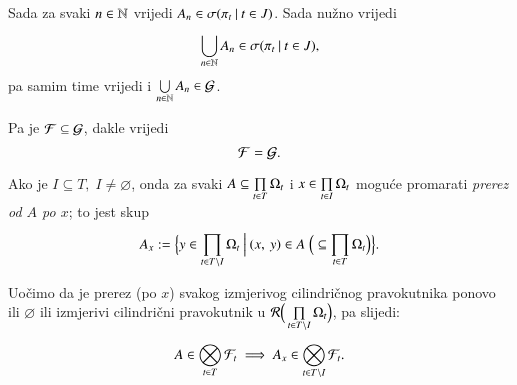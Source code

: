 \begin{rj}
\begin{enumerate}[label=(\roman*)]
        Sada za svaki $n \in \mathbb{N}$ vrijedi $A_n \in \sigma({\pi_t} \: | \: {t \in J})$.
        Sada nu\v zno vrijedi
        \begin{equation*}
            \bigcup\limits_{n \in \mathbb{N}}^{} A_n \in \sigma({\pi_t} \: | \: {t \in J}),
        \end{equation*}
        pa samim time vrijedi i $\bigcup\limits_{n \in \mathbb{N}}^{} A_n \in \mathcal{G}$.
    \end{enumerate}
    Pa je $\mathcal{F} \subseteq \mathcal{G}$, dakle vrijedi
    \begin{equation*}
        \mathcal{F} = \mathcal{G}.
    \end{equation*}
\end{rj}

\begin{defn}    \label{defn:4.6-1}
    Ako je $I \subseteq T, \; I \neq \varnothing$, onda za svaki $A \subseteq \prod\limits_{t \in T}^{} \Omega_t$ i $x \in \prod\limits_{t \in I}^{} \Omega_t$ mogu\' ce promarati \emph{prerez od $A$ po $x$}; to jest skup
    \begin{equation*}
        A_x := \Big\{ {y \in \prod\limits_{t \in T \setminus I}^{} \Omega_t} \: \Big| \: {(x, \: y) \in A \; \Big(\subseteq \prod\limits_{t \in T}^{} \Omega_t \Big)} \Big\}.
    \end{equation*}
\end{defn}
Uo\v cimo da je prerez (po $x$) svakog izmjerivog cilindri\v cnog pravokutnika ponovo ili $\varnothing$ ili izmjerivi cilindri\v cni pravokutnik u $\mathcal{R} \Big( \prod\limits_{t \in T \setminus I}^{} \Omega_t \Big)$, pa slijedi:
\begin{equation}    \label{jed:4.7}
    A \in \bigotimes\limits_{t \in T}^{} \mathcal{F}_t \implies A_x \in \bigotimes\limits_{t \in T \setminus I}^{} \mathcal{F}_t.
\end{equation}

